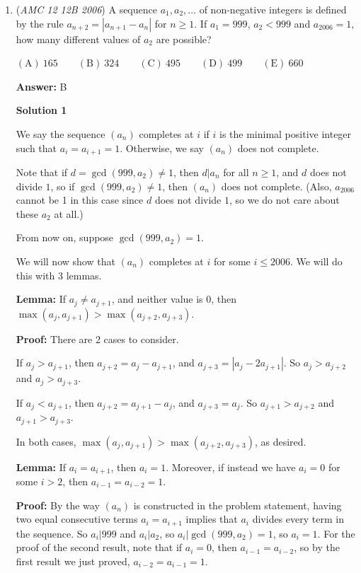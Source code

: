 \begin{enumerate}
 


	\item (\textit{AMC 12 12B 2006}) A sequence $a_1,a_2,\dots$ of non-negative integers is defined by the rule $a_{n+2}=|a_{n+1}-a_n|$ for $n\geq 1$. If $a_1=999$, $a_2<999$ and $a_{2006}=1$, how many different values of $a_2$ are possible?


 $\mathrm{(A)}\ 165 \qquad \mathrm{(B)}\ 324 \qquad \mathrm{(C)}\ 495 \qquad \mathrm{(D)}\ 499 \qquad \mathrm{(E)}\ 660$

 \textbf{Answer: }B



\textbf{Solution 1}

We say the sequence $(a_n)$ completes at $i$ if $i$ is the minimal positive integer such that $a_i = a_{i + 1} = 1$. Otherwise, we say $(a_n)$ does not complete.

 
Note that if $d = \gcd(999, a_2) \neq 1$, then $d|a_n$ for all $n \geq 1$, and $d$ does not divide $1$, so if $\gcd(999, a_2) \neq 1$, then $(a_n)$ does not complete. (Also, $a_{2006}$ cannot be 1 in this case since $d$ does not divide $1$, so we do not care about these $a_2$ at all.)

 From now on, suppose $\gcd(999, a_2) = 1$.

 
We will now show that $(a_n)$ completes at $i$ for some $i \leq 2006$. We will do this with 3 lemmas.

 
\textbf{Lemma:} If $a_j \neq a_{j + 1}$, and neither value is $0$, then $\max(a_j, a_{j + 1}) > \max(a_{j + 2}, a_{j + 3})$.

 \textbf{Proof:} There are 2 cases to consider.

 If $a_j > a_{j + 1}$, then $a_{j + 2} = a_j - a_{j + 1}$, and $a_{j + 3} = |a_j - 2a_{j + 1}|$. So $a_j > a_{j + 2}$ and $a_j > a_{j + 3}$.

 If $a_j < a_{j + 1}$, then $a_{j + 2} = a_{j + 1} - a_j$, and $a_{j + 3} = a_j$. So $a_{j + 1} > a_{j + 2}$ and $a_{j + 1} > a_{j + 3}$.

 In both cases, $\max(a_j, a_{j + 1}) > \max(a_{j + 2}, a_{j + 3})$, as desired.

 \textbf{Lemma:} If $a_i = a_{i + 1}$, then $a_i = 1$. Moreover, if instead we have $a_i = 0$ for some $i > 2$, then $a_{i - 1} = a_{i - 2} = 1$.

 \textbf{Proof:} By the way $(a_n)$ is constructed in the problem statement, having two equal consecutive terms $a_i = a_{i + 1}$ implies that $a_i$ divides every term in the sequence. So $a_i | 999$ and $a_i | a_2$, so $a_i | \gcd(999, a_2) = 1$, so $a_i = 1$. For the proof of the second result, note that if $a_i = 0$, then $a_{i - 1} = a_{i - 2}$, so by the first result we just proved, $a_{i - 2} = a_{i - 1} = 1$.


\end{enumerate}
